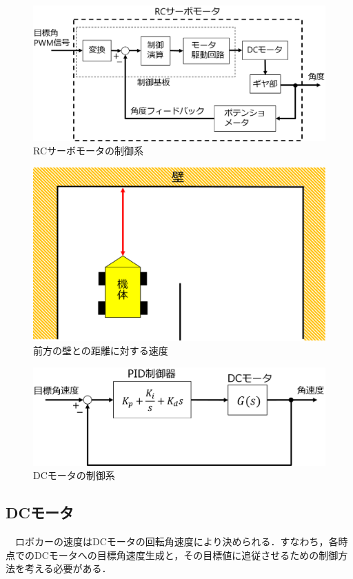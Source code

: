  \begin{figure}[htb]

  \centering
    \includegraphics[width=0.6\hsize]{picture/eps/RC_construction.eps}
  \caption{RCサーボモータの制御系}
  \label{fig::RC_construction}
\end{figure} 

 \begin{figure}[htb]

  \centering
    \includegraphics[width=0.4\hsize]{picture/eps/speed_wall.eps}
  \caption{前方の壁との距離に対する速度}
  \label{fig::speed_wall}
\end{figure}

\begin{figure}[htb]
  \centering
    \includegraphics[width=0.5\hsize]{picture/eps/PID_control.eps}
  \caption{DCモータの制御系}
  \label{fig::PID_control}
\end{figure}

\clearpage
\subsection{DCモータ}
　ロボカーの速度はDCモータの回転角速度により決められる．すなわち，各時点でのDCモータへの目標角速度生成と，その目標値に追従させるための制御方法を考える必要がある．


